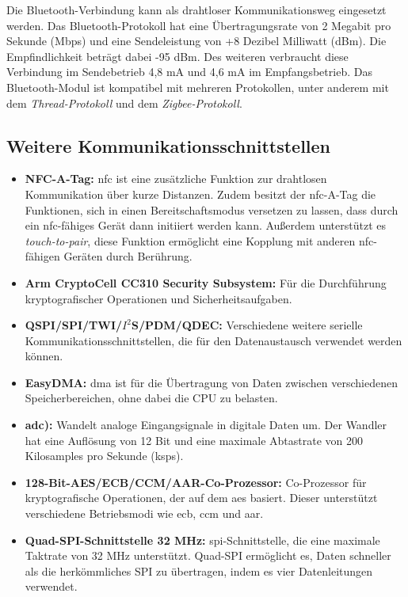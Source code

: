 Die Bluetooth-Verbindung kann als drahtloser Kommunikationsweg eingesetzt werden. Das Bluetooth-Protokoll hat eine Übertragungsrate von 2 Megabit pro Sekunde (Mbps) und eine Sendeleistung von +8 Dezibel Milliwatt (dBm). Die Empfindlichkeit beträgt dabei -95 dBm. Des weiteren verbraucht diese Verbindung im Sendebetrieb 4,8 mA und 4,6 mA im Empfangsbetrieb. Das Bluetooth-Modul ist kompatibel mit mehreren Protokollen, unter anderem mit dem \textit{Thread-Protokoll} und dem \textit{Zigbee-Protokoll}.\cite{Ard.2024} \cite{NrdSem4.2024}

\subsection{Weitere Kommunikationsschnittstellen}
\cite{Ard.2024}
	\begin{itemize}
		\item \textbf{NFC-A-Tag:} \ac{nfc} ist eine zusätzliche Funktion zur drahtlosen Kommunikation über kurze Distanzen. Zudem besitzt der \ac{nfc}-A-Tag die Funktionen, sich in einen Bereitschaftsmodus versetzen zu lassen, dass durch ein \ac{nfc}-fähiges Gerät dann initiiert werden kann. Außerdem unterstützt es \textit{touch-to-pair}, diese Funktion ermöglicht eine Kopplung mit anderen \ac{nfc}-fähigen Geräten durch Berührung.
		\item \textbf{Arm CryptoCell CC310 Security Subsystem:} Für die Durchführung kryptografischer Operationen und Sicherheitsaufgaben.\\ \cite{NrdSem.2024}
		\item \textbf{QSPI/SPI/TWI/$I^2$S/PDM/QDEC:} Verschiedene weitere serielle Kommunikationsschnittstellen, die für den Datenaustausch verwendet werden können.
		\item \textbf{EasyDMA:} \ac{dma} ist für die Übertragung von Daten zwischen verschiedenen Speicherbereichen, ohne dabei die CPU zu belasten.\cite{Gehrke.2022}
		\item \textbf{\ac{adc}):} Wandelt analoge Eingangsignale in digitale Daten um. Der Wandler hat eine Auflösung von 12 Bit und eine maximale Abtastrate von 200 Kilosamples pro Sekunde (ksps).
		\item \textbf{128-Bit-AES/ECB/CCM/AAR-Co-Prozessor:} Co-Prozessor für kryptografische Operationen, der auf dem \ac{aes} basiert. Dieser unterstützt verschiedene Betriebsmodi wie \ac{ecb}, \ac{ccm} und \ac{aar}. \cite{NrdSem2.2024}
		\item \textbf{Quad-SPI-Schnittstelle 32 MHz:} \ac{spi}-Schnittstelle, die eine maximale Taktrate von 32 MHz unterstützt. Quad-SPI ermöglicht es, Daten schneller als die herkömmliches SPI zu übertragen, indem es vier Datenleitungen verwendet.\cite{NrdSem3.2023}
	\end{itemize}

